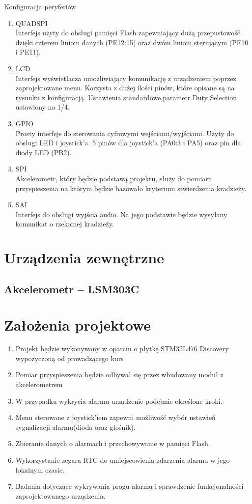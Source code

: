 \documentclass[10pt, a4paper]{article}
\begin{document}
Konfiguracja peryferiów
\begin{enumerate}
\item QUADSPI\\
Interfejs użyty do obsługi pamięci Flash zapewniający dużą przepustowość dzięki czterem liniom danych (PE12:15) oraz dwóm liniom sterującym (PE10 i PE11).
\item LCD\\
Interfejs wyświetlacza umożliwiający komunikację z urządzeniem poprzez zaprojektowane menu. Korzysta z dużej ilości pinów, które opisane są na rysunku z konfiguracją. Ustawienia standardowe,parametr Duty Selection ustawiony na 1/4.
\item GPIO \\
Prosty interfejs do sterowania cyfrowymi wejściami/wyjściami. Użyty do obsługi LED i joystick'a. 5 pinów dla joystick'a (PA0:3 i PA5) oraz pin dla diody LED (PB2).
\item SPI\\
Akcelerometr, który będzie podstawą projektu, służy do pomiaru przyspieszenia na którym będzie bazowało kryterium stwierdzenia kradzieży.
\item SAI\\
Interfejs do obsługi wyjścia audio. Na jego podstawie będzie wysyłany komunikat o rzekomej kradzieży.
\end{enumerate}

\section{Urządzenia zewnętrzne}
\subsection{Akcelerometr -- LSM303C}

\section{Założenia projektowe}
\begin{enumerate}
\item Projekt będzie wykonywany w oparciu o płytkę STM32L476 Discovery wypożyczoną od prowadzącego kurs
\item Pomiar przyspieszenia będzie odbywał się przez wbudowany moduł z akcelerometrem
\item W przypadku wykrycia alarmu urządzenie podejmie określone kroki.
\item Menu sterowane z joystick'iem zapewni możliwość wybór ustawień sygnalizacji alarmu(dioda oraz głośnik).
\item Zbieranie danych o alarmach i przechowywanie w pamięci Flash.
\item Wykorzystanie zegara RTC do umiejscowienia zdarzenia alarmu w jego lokalnym czasie.
\item Badania dotyczące wykrywania progu alarmu i sprawdzenie funkcjonalności zaprojektowanego urządzenia.

\end{enumerate}
\end{document}
